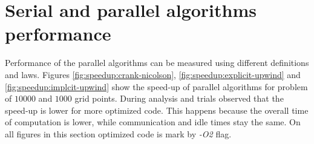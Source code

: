\section{Serial and parallel algorithms performance} \label{s:results:performance-serial-parallel}
	Performance of the parallel algorithms can be measured using different definitions and laws. Figures \ref{fig:speedup:crank-nicolson}, \ref{fig:speedup:explicit-upwind} and \ref{fig:speedup:implcit-upwind} show the \gls{speed-up} of parallel algorithms for problem of $10000$ and $1000$ grid points. 		
	During analysis and trials observed that the \gls{speed-up} is lower for more optimized code. This happens because the overall time of computation is lower, while communication and idle times stay the same. On all figures in this section optimized code is mark by \emph{-O2} flag. 
	

